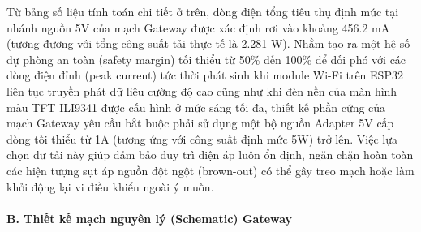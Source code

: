 \documentclass{article} %
\begin{document}
Từ bảng số liệu tính toán chi tiết ở trên, dòng điện tổng tiêu thụ định mức tại nhánh nguồn 5V của mạch Gateway được xác định rơi vào khoảng 456.2 mA (tương đương với tổng công suất tải thực tế là 2.281 W). Nhằm tạo ra một hệ số dự phòng an toàn (safety margin) tối thiểu từ 50\% đến 100\% để đối phó với các dòng điện đỉnh (peak current) tức thời phát sinh khi module Wi-Fi trên ESP32 liên tục truyền phát dữ liệu cường độ cao cũng như khi đèn nền của màn hình màu TFT ILI9341 được cấu hình ở mức sáng tối đa, thiết kế phần cứng của mạch Gateway yêu cầu bắt buộc phải sử dụng một bộ nguồn Adapter 5V cấp dòng tối thiểu từ 1A (tương ứng với công suất định mức 5W) trở lên. Việc lựa chọn dư tải này giúp đảm bảo duy trì điện áp luôn ổn định, ngăn chặn hoàn toàn các hiện tượng sụt áp nguồn đột ngột (brown-out) có thể gây treo mạch hoặc làm khởi động lại vi điều khiển ngoài ý muốn.

\paragraph{B. Thiết kế mạch nguyên lý (Schematic) Gateway} \mbox{}\\
\end{document}
